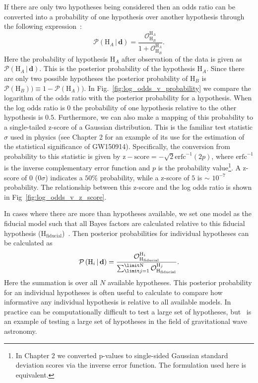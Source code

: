 If there are only two hypotheses being considered then an odds ratio can be converted into a probability of one hypothesis over another hypothesis through the following expression~\citep{read2006encyclopedia}:
\begin{equation}\label{eqn:probability_odds_ratio}
    \mathcal{P} \left(\mathrm{H}_A \, | \, \mathbf{d}\right) = \frac{\mathcal{O}^{\mathrm{H}_A}_{\mathrm{H}_B}}{1 + \mathcal{O}^{\mathrm{H}_A}_{\mathrm{H}_B}}.
\end{equation}
Here the probability of hypothesis $\mathrm{H}_A$ after observation of the data is given as $\mathcal{P}(\mathrm{H}_A \, | \, \mathbf{d})$. This is the posterior probability of the hypothesis $\mathrm{H}_A$. Since there are only two possible hypotheses the posterior probability of $\mathrm{H}_B$ is $\mathcal{P}(\mathrm{H}_B)) \equiv 1 - \mathcal{P}(\mathrm{H}_A))$. In Fig.~\ref{fig:log_odds_v_probability} we compare the logarithm of the odds ratio with the posterior probability for a hypothesis. When the log odds ratio is $0$ the probability of one hypothesis relative to the other hypothesis is $0.5$. Furthermore, we can also make a mapping of this probability to a single-tailed z-score of a Gaussian distribution. This is the familiar test statistic $\sigma$ used in physics (see Chapter 2 for an example of its use for the estimation of the statistical significance of GW150914). Specifically, the conversion from probability to this statistic is given by $\mathrm{z-score} = -\sqrt{2} \mathrm{erfc}^{-1}(2p)$, where $\mathrm{erfc}^{-1}$ is the inverse complementary error function and $p$ is the probability value\footnote{In Chapter 2 we converted p-values to single-sided Gaussian standard deviation scores via the inverse error function. The formulation used here is equivalent.}. A z-score of $0$ ($0 \sigma$) indicates a $50\%$ probability, while a z-score of $5$ is $\sim$ $10^{-7}$ probability. The relationship between this z-score and the log odds ratio is shown in Fig~\ref{fig:log_odds_v_z_score}.

In cases where there are more than hypotheses available, we set one model as the fiducial model such that all Bayes factors are calculated relative to this fiducial hypothesis ($\mathrm{H}_{\mathrm{fiducial}}$)~\cite{read2006encyclopedia}. Then posterior probabilities for individual hypotheses can be calculated as
\begin{equation}\label{eqn:posterior_prob_multi}
    \mathcal{P} \left(\mathrm{H}_i \, | \, \mathbf{d}\right) = \frac{\mathcal{O}^{\mathrm{H}_i}_{\mathrm{H}_{\mathrm{fiducial}}}}
                                              {\sum^{\limit \mathrm{N}}_{\limit j=1} \mathcal{O}^{\mathrm{H}_j}_{\mathrm{H}_{\mathrm{fiducial}}}}.
\end{equation}
Here the summation is over all $N$ available hypotheses. This posterior probability for an individual hypotheses is often useful to calculate to compare how informative any individual hypothesis is relative to all available models. In practice can be computationally difficult to test a large set of hypotheses, but~\cite{ligo2019model} is an example of testing a large set of hypotheses in the field of gravitational wave astronomy.


